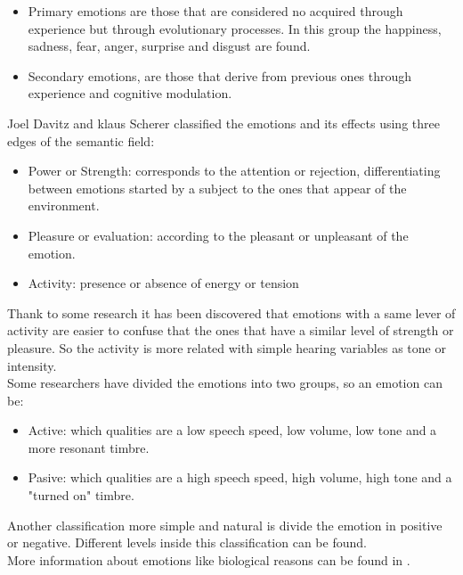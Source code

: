 \begin{itemize}
	\item Primary emotions are those that are considered no acquired through experience but through evolutionary processes. In this group the happiness, sadness, fear, anger, surprise and disgust are found.
	\item Secondary emotions, are those that derive from previous ones through experience and cognitive modulation.
\end{itemize}
Joel Davitz and klaus Scherer classified the emotions and its effects using three edges of the semantic field:
\begin{itemize}
	\item Power or Strength: corresponds to the attention or rejection, differentiating between emotions started by a subject to the ones that appear of the environment.
	\item Pleasure or evaluation: according to the pleasant or unpleasant of the emotion.
	\item Activity: presence or absence of energy or tension
\end{itemize}
Thank to some research it has been discovered that emotions with a same lever of activity are easier to confuse that the ones that have a similar level of strength or pleasure. So the activity is more related with simple hearing variables as tone or intensity.\\
Some researchers have divided the emotions into two groups, so an emotion can be:
\begin{itemize}
	\item Active: which qualities are a low speech speed, low volume, low tone and a more resonant timbre.
	\item Pasive: which qualities are a high speech speed, high volume, high tone and a "turned on" timbre.
\end{itemize}
Another classification more simple and natural is divide the emotion in positive or negative. Different levels inside this classification can be found.\\
More information about emotions like biological reasons can be found in \cite{trabajo-emo}.
